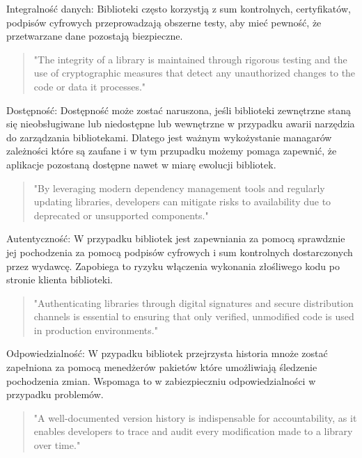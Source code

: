 \documentclass[runningheads,12pt]{llncs}
\begin{document}
Integralność danych: Biblioteki często korzystją z sum kontrolnych, certyfikatów, podpisów cyfrowych przeprowadzają obszerne testy, aby mieć pewność, że przetwarzane dane pozostają biezpieczne.

\begin{quote}
    "The integrity of a library is maintained through rigorous testing and the use of cryptographic measures that detect any unauthorized changes to the code or data it processes." ~\cite[p. 84]{Essential}
\end{quote}

Dostępność: Dostępność może zostać naruszona, jeśli biblioteki zewnętrzne staną się nieobsługiwane lub niedostępne lub wewnętrzne w przypadku awarii narzędzia do zarządzania bibliotekami. Dlatego jest ważnym wykożystanie managarów zależności które są zaufane i w tym przupadku możemy pomaga zapewnić, że aplikacje pozostaną dostępne nawet w miarę ewolucji bibliotek.

\begin{quote}
    "By leveraging modern dependency management tools and regularly updating libraries, developers can mitigate risks to availability due to deprecated or unsupported components." ~\cite[p. 85]{Essential}
\end{quote}

Autentyczność: W przypadku bibliotek jest zapewniania za pomocą sprawdznie jej pochodzenia za pomocą podpisów cyfrowych i sum kontrolnych dostarczonych przez wydawcę. Zapobiega to ryzyku włączenia wykonania złośliwego kodu po stronie klienta biblioteki. 

\begin{quote}
    "Authenticating libraries through digital signatures and secure distribution channels is essential to ensuring that only verified, unmodified code is used in production environments." ~\cite[p. 87]{Essential}
\end{quote}

Odpowiedzialność: W pzypadku bibliotek przejrzysta historia mnoże zostać zapełniona za pomocą menedżerów pakietów które umożliwiają śledzenie pochodzenia zmian. Wspomaga to w zabiezpieczniu odpowiedzialności w przypadku problemów.

\begin{quote}
    "A well-documented version history is indispensable for accountability, as it enables developers to trace and audit every modification made to a library over time." ~\cite[p. 88]{Essential}
\end{quote}
\end{document}

